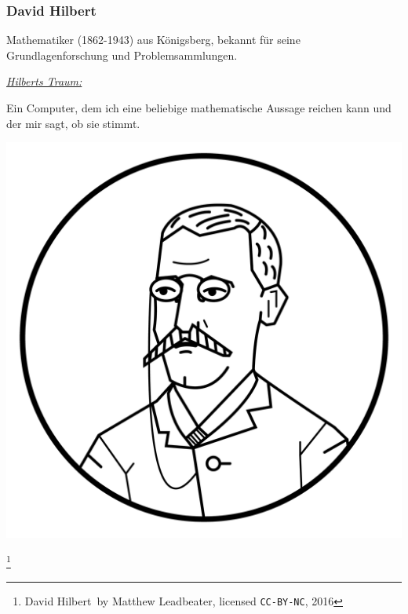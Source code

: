 \documentclass[aspectratio=169]{beamer}
\newcommand\blfootnote[1]{%
  \begingroup
  \renewcommand\thefootnote{}\footnote{#1}%
  \addtocounter{footnote}{-1}%
  \endgroup
}
\begin{document}
\begin{frame}
\frametitle{David Hilbert}

\begin{multicols}{2}

Mathematiker (1862-1943) aus Königsberg, bekannt für seine Grundlagenforschung und Problemsammlungen.
\bigskip

\emph{\underline{Hilberts Traum:}}\\\smallskip

Ein Computer, dem ich eine beliebige mathematische Aussage reichen kann und der mir sagt, ob sie stimmt. 

\columnbreak

\begin{center}
\includegraphics[scale=0.3]{images/hilbert-circle.png} 
\end{center}

\end{multicols}

\blfootnote{\glqq David Hilbert\grqq\ by Matthew Leadbeater, licensed \texttt{CC-BY-NC}, 2016}

\end{frame}

\end{document}
